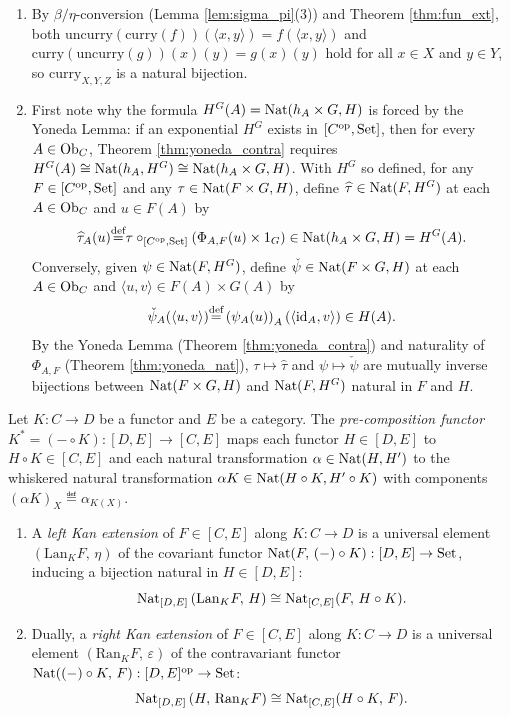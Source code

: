 \documentclass[10pt,a4paper]{article}
\begin{document}
\begin{enumerate}
\item By $\beta/\eta$-conversion (Lemma \ref{lem:sigma_pi}(3)) and Theorem \ref{thm:fun_ext}, both $\mathrm{uncurry}(\mathrm{curry}(f))(\langle x,y \rangle) = f(\langle x,y \rangle)$ and $\mathrm{curry}(\mathrm{uncurry}(g))(x)(y) = g(x)(y)$ hold for all $x \in X$ and $y \in Y$, so $\mathrm{curry}_{X,Y,Z}$ is a natural bijection.
\item First note why the formula $H^G(A) = {\textrm{Nat}}(h_A \times G, H)$ is forced by the Yoneda Lemma: if an exponential $H^G$ exists in $[C^{\textrm{op}}, {\textrm{Set}}]$, then for every $A \in {\textrm{Ob}}_C$, Theorem \ref{thm:yoneda_contra} requires $H^G(A) \cong {\textrm{Nat}}(h_A, H^G) \cong {\textrm{Nat}}(h_A \times G, H)$. With $H^G$ so defined, for any $F \in [C^{\textrm{op}}, {\textrm{Set}}]$ and any $\tau \in {\textrm{Nat}}(F \times G, H)$, define $\widehat{\tau} \in {\textrm{Nat}}(F, H^G)$ at each $A \in {\textrm{Ob}}_C$ and $u \in F(A)$ by
$$\widehat{\tau}_A(u) {\stackrel{{\textrm{def}}}{=}} \tau \circ_{[C^{\textrm{op}},{\textrm{Set}}]} \left(\Phi_{A,F}(u) \times 1_G\right) \in {\textrm{Nat}}(h_A \times G, H) = H^G(A).$$
Conversely, given $\psi \in {\textrm{Nat}}(F, H^G)$, define $\check{\psi} \in {\textrm{Nat}}(F \times G, H)$ at each $A \in {\textrm{Ob}}_C$ and $\langle u, v \rangle \in F(A) \times G(A)$ by
$$\check{\psi}_A(\langle u, v \rangle) {\stackrel{{\textrm{def}}}{=}} \left(\psi_A(u)\right)_A(\langle {\textrm{id}}_A, v \rangle) \in H(A).$$
By the Yoneda Lemma (Theorem \ref{thm:yoneda_contra}) and naturality of $\Phi_{A,F}$ (Theorem \ref{thm:yoneda_nat}), $\tau \mapsto \widehat{\tau}$ and $\psi \mapsto \check{\psi}$ are mutually inverse bijections between ${\textrm{Nat}}(F \times G, H)$ and ${\textrm{Nat}}(F, H^G)$ natural in $F$ and $H$.
\end{enumerate}
\myqed

\begin{definition}\label{def:kan_ext}
Let $K : C \to D$ be a functor and $E$ be a category. The \emph{pre-composition functor} $K^* = (- \circ K) : [D, E] \to [C, E]$ maps each functor $H \in [D, E]$ to $H \circ K \in [C, E]$ and each natural transformation $\alpha \in {\textrm{Nat}}(H, H')$ to the whiskered natural transformation $\alpha K \in {\textrm{Nat}}(H \circ K, H' \circ K)$ with components $(\alpha K)_X \eqdef \alpha_{K(X)}$.
\begin{enumerate}
\item A \emph{left Kan extension} of $F \in [C, E]$ along $K : C \to D$ is a universal element $(\mathrm{Lan}_K F,\, \eta)$ of the covariant functor ${\textrm{Nat}}(F,\, (-) \circ K) : [D, E] \to {\textrm{Set}}$, inducing a bijection natural in $H \in [D, E]$:
$${\textrm{Nat}}_{[D,E]}\left(\mathrm{Lan}_K F,\, H\right) \cong {\textrm{Nat}}_{[C,E]}(F,\, H \circ K).$$
\item Dually, a \emph{right Kan extension} of $F \in [C, E]$ along $K : C \to D$ is a universal element $(\mathrm{Ran}_K F,\, \varepsilon)$ of the contravariant functor ${\textrm{Nat}}((-) \circ K,\, F) : [D, E]^{\textrm{op}} \to {\textrm{Set}}$:
$${\textrm{Nat}}_{[D,E]}\left(H,\, \mathrm{Ran}_K F\right) \cong {\textrm{Nat}}_{[C,E]}(H \circ K,\, F).$$
\end{enumerate}
\end{definition}
\end{document}
